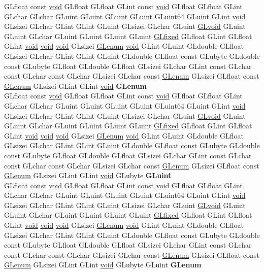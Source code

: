 \begin{DoxyCompactItemize}
\begin{tabbing}
\>GLfloat const \hyperlink{interfacevoid}{void} GLfloat GLfloat GLint const \hyperlink{interfacevoid}{void} GLfloat GLfloat GLint GLchar GLchar GLuint GLuint GLuint GLuint GLuint64 GLuint GLint \hyperlink{interfacevoid}{void} GLsizei GLchar GLint GLint GLuint GLsizei GLchar GLuint \hyperlink{interfacevoid}{GLvoid} GLuint GLuint GLchar GLuint GLuint GLuint GLuint \hyperlink{glheader_8h_ad6d3fa892df40dedf48ee6d84529ae5e}{GLfixed} GLfloat GLint GLfloat GLint \hyperlink{interfacevoid}{void} \hyperlink{interfacevoid}{void} \hyperlink{interfacevoid}{void} GLsizei \hyperlink{interfacevoid}{GLenum} \hyperlink{interfacevoid}{void} GLint GLuint GLdouble GLfloat GLsizei GLchar GLint GLint GLuint GLdouble GLfloat const GLubyte GLdouble const GLubyte GLfloat GLdouble GLfloat GLsizei GLchar GLint const GLchar const GLchar const GLchar GLsizei GLchar const \hyperlink{interfacevoid}{GLenum} GLsizei GLfloat const \hyperlink{interfacevoid}{GLenum} GLsizei GLint GLint \hyperlink{interfacevoid}{void} {\bfseries GLenum}\\
\>GLfloat const \hyperlink{interfacevoid}{void} GLfloat GLfloat GLint const \hyperlink{interfacevoid}{void} GLfloat GLfloat GLint GLchar GLchar GLuint GLuint GLuint GLuint GLuint64 GLuint GLint \hyperlink{interfacevoid}{void} GLsizei GLchar GLint GLint GLuint GLsizei GLchar GLuint \hyperlink{interfacevoid}{GLvoid} GLuint GLuint GLchar GLuint GLuint GLuint GLuint \hyperlink{glheader_8h_ad6d3fa892df40dedf48ee6d84529ae5e}{GLfixed} GLfloat GLint GLfloat GLint \hyperlink{interfacevoid}{void} \hyperlink{interfacevoid}{void} \hyperlink{interfacevoid}{void} GLsizei \hyperlink{interfacevoid}{GLenum} \hyperlink{interfacevoid}{void} GLint GLuint GLdouble GLfloat GLsizei GLchar GLint GLint GLuint GLdouble GLfloat const GLubyte GLdouble const GLubyte GLfloat GLdouble GLfloat GLsizei GLchar GLint const GLchar const GLchar const GLchar GLsizei GLchar const \hyperlink{interfacevoid}{GLenum} GLsizei GLfloat const \hyperlink{interfacevoid}{GLenum} GLsizei GLint GLint \hyperlink{interfacevoid}{void} GLubyte {\bfseries GLuint}\\
\>GLfloat const \hyperlink{interfacevoid}{void} GLfloat GLfloat GLint const \hyperlink{interfacevoid}{void} GLfloat GLfloat GLint GLchar GLchar GLuint GLuint GLuint GLuint GLuint64 GLuint GLint \hyperlink{interfacevoid}{void} GLsizei GLchar GLint GLint GLuint GLsizei GLchar GLuint \hyperlink{interfacevoid}{GLvoid} GLuint GLuint GLchar GLuint GLuint GLuint GLuint \hyperlink{glheader_8h_ad6d3fa892df40dedf48ee6d84529ae5e}{GLfixed} GLfloat GLint GLfloat GLint \hyperlink{interfacevoid}{void} \hyperlink{interfacevoid}{void} \hyperlink{interfacevoid}{void} GLsizei \hyperlink{interfacevoid}{GLenum} \hyperlink{interfacevoid}{void} GLint GLuint GLdouble GLfloat GLsizei GLchar GLint GLint GLuint GLdouble GLfloat const GLubyte GLdouble const GLubyte GLfloat GLdouble GLfloat GLsizei GLchar GLint const GLchar const GLchar const GLchar GLsizei GLchar const \hyperlink{interfacevoid}{GLenum} GLsizei GLfloat const \hyperlink{interfacevoid}{GLenum} GLsizei GLint GLint \hyperlink{interfacevoid}{void} GLubyte GLuint {\bfseries GLenum}\\

\end{tabbing}
\end{DoxyCompactItemize}
